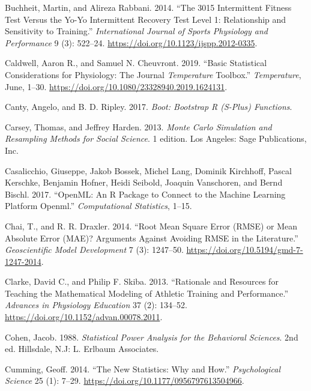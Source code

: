 \documentclass[
]{book}
\newlength{\cslhangindent}
\newenvironment{cslreferences}%
  {\setlength{\parindent}{0pt}%
  \everypar{\setlength{\hangindent}{\cslhangindent}}\ignorespaces}%
  {\par}
\begin{document}
\begin{cslreferences}
\leavevmode\hypertarget{ref-buchheit3015Intermittent2014}{}%
Buchheit, Martin, and Alireza Rabbani. 2014. ``The 3015 Intermittent Fitness Test Versus the Yo-Yo Intermittent Recovery Test Level 1: Relationship and Sensitivity to Training.'' \emph{International Journal of Sports Physiology and Performance} 9 (3): 522--24. \url{https://doi.org/10.1123/ijspp.2012-0335}.

\leavevmode\hypertarget{ref-caldwellBasicStatisticalConsiderations2019}{}%
Caldwell, Aaron R., and Samuel N. Cheuvront. 2019. ``Basic Statistical Considerations for Physiology: The Journal \emph{Temperature} Toolbox.'' \emph{Temperature}, June, 1--30. \url{https://doi.org/10.1080/23328940.2019.1624131}.

\leavevmode\hypertarget{ref-cantyBootBootstrapSPlus2017}{}%
Canty, Angelo, and B. D. Ripley. 2017. \emph{Boot: Bootstrap R (S-Plus) Functions}.

\leavevmode\hypertarget{ref-carseyMonteCarloSimulation2013}{}%
Carsey, Thomas, and Jeffrey Harden. 2013. \emph{Monte Carlo Simulation and Resampling Methods for Social Science}. 1 edition. Los Angeles: Sage Publications, Inc.

\leavevmode\hypertarget{ref-R-openml}{}%
Casalicchio, Giuseppe, Jakob Bossek, Michel Lang, Dominik Kirchhoff, Pascal Kerschke, Benjamin Hofner, Heidi Seibold, Joaquin Vanschoren, and Bernd Bischl. 2017. ``OpenML: An R Package to Connect to the Machine Learning Platform Openml.'' \emph{Computational Statistics}, 1--15.

\leavevmode\hypertarget{ref-chaiRootMeanSquare2014}{}%
Chai, T., and R. R. Draxler. 2014. ``Root Mean Square Error (RMSE) or Mean Absolute Error (MAE)? Arguments Against Avoiding RMSE in the Literature.'' \emph{Geoscientific Model Development} 7 (3): 1247--50. \url{https://doi.org/10.5194/gmd-7-1247-2014}.

\leavevmode\hypertarget{ref-clarkeRationaleResourcesTeaching2013}{}%
Clarke, David C., and Philip F. Skiba. 2013. ``Rationale and Resources for Teaching the Mathematical Modeling of Athletic Training and Performance.'' \emph{Advances in Physiology Education} 37 (2): 134--52. \url{https://doi.org/10.1152/advan.00078.2011}.

\leavevmode\hypertarget{ref-cohenStatisticalPowerAnalysis1988}{}%
Cohen, Jacob. 1988. \emph{Statistical Power Analysis for the Behavioral Sciences}. 2nd ed. Hillsdale, N.J: L. Erlbaum Associates.

\leavevmode\hypertarget{ref-cummingNewStatisticsWhy2014}{}%
Cumming, Geoff. 2014. ``The New Statistics: Why and How.'' \emph{Psychological Science} 25 (1): 7--29. \url{https://doi.org/10.1177/0956797613504966}.


\end{cslreferences}
\end{document}
